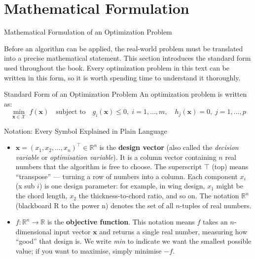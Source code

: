 \documentclass[aspectratio=169,10pt]{beamer}
\newcommand{\vx}{\mathbf{x}}
\newcommand{\R}{\mathbb{R}}
\begin{document}
\section{Mathematical Formulation}

\begin{frame}[allowframebreaks]{Mathematical Formulation of an Optimization Problem}

Before an algorithm can be applied, the real-world problem must be translated
into a precise mathematical statement.  This section introduces the standard
form used throughout the book.  Every optimization problem in this text can
be written in this form, so it is worth spending time to understand it thoroughly.

  \begin{block}{Standard Form of an Optimization Problem}
    An optimization problem is written as:
    \[
      \min_{\vx \in \mathcal{X}} \; f(\vx)
      \quad \text{subject to} \quad
      g_i(\vx) \leq 0, \; i = 1,\ldots,m,
      \quad
      h_j(\vx) = 0, \; j = 1,\ldots,p
    \]
  \end{block}

  \begin{block}{Notation: Every Symbol Explained in Plain Language}
    \begin{itemize}
      \item $\vx = (x_1, x_2, \ldots, x_n)^\top \in \R^n$ is the
        \textbf{design vector} (also called the \emph{decision variable} or
        \emph{optimisation variable}).  It is a column vector containing $n$
        real numbers that the algorithm is free to choose.  The superscript
        $\top$ (top) means ``transpose'' --- turning a row of numbers into
        a column.  Each component $x_i$ (x sub $i$) is one design parameter:
        for example, in wing design, $x_1$ might be the chord length, $x_2$ the
        thickness-to-chord ratio, and so on.  The notation $\R^n$ (blackboard R
        to the power n) denotes the set of all $n$-tuples of real numbers.

      \item $f : \R^n \to \R$ is the \textbf{objective function}.  This notation
        means $f$ takes an $n$-dimensional input vector $\vx$ and returns a
        single real number, measuring how ``good'' that design is.  We write
        \emph{min} to indicate we want the smallest possible value; if you want
        to maximise, simply minimise $-f$.


\end{itemize}
\end{block}
\end{frame}
\end{document}
